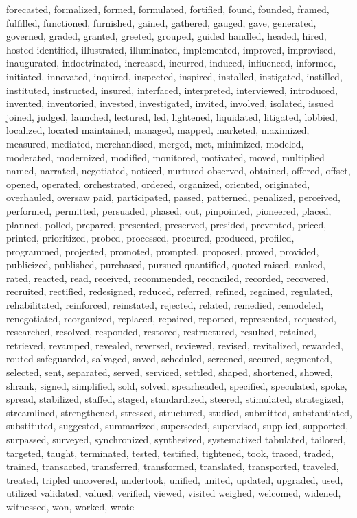\documentclass[a4paper,11pt]{article} %
\begin{document}
forecasted, formalized, formed, formulated, fortified, found, founded, framed,
fulfilled, functioned, furnished,
gained, gathered, gauged, gave, generated, governed, graded, granted, greeted,
grouped, guided
handled, headed, hired, hosted
identified, illustrated, illuminated, implemented, improved, improvised,
inaugurated, indoctrinated, increased, incurred, induced, influenced, informed,
initiated, innovated, inquired, inspected, inspired, installed, instigated,
instilled, instituted, instructed, insured, interfaced, interpreted,
interviewed, introduced, invented, inventoried, invested, investigated, invited,
involved, isolated, issued
joined, judged,
launched, lectured, led, lightened, liquidated, litigated, lobbied, localized,
located
maintained, managed, mapped, marketed, maximized, measured, mediated,
merchandised, merged, met, minimized, modeled, moderated, modernized, modified,
monitored, motivated, moved, multiplied
named, narrated, negotiated, noticed, nurtured
observed, obtained, offered, offset, opened, operated, orchestrated, ordered,
organized, oriented, originated, overhauled, oversaw
paid, participated, passed, patterned, penalized, perceived, performed,
permitted, persuaded, phased, out, pinpointed, pioneered, placed, planned,
polled, prepared, presented, preserved, presided, prevented, priced, printed,
prioritized, probed, processed, procured, produced, profiled, programmed,
projected, promoted, prompted, proposed, proved, provided, publicized,
published, purchased, pursued
quantified, quoted
raised, ranked, rated, reacted, read, received, recommended, reconciled,
recorded, recovered, recruited, rectified, redesigned, reduced, referred,
refined, regained, regulated, rehabilitated, reinforced, reinstated, rejected,
related, remedied, remodeled, renegotiated, reorganized, replaced, repaired,
reported, represented, requested, researched, resolved, responded, restored,
restructured, resulted, retained, retrieved, revamped, revealed, reversed,
reviewed, revised, revitalized, rewarded, routed
safeguarded, salvaged, saved, scheduled, screened, secured, segmented, selected,
sent, separated, served, serviced, settled, shaped, shortened, showed, shrank,
signed, simplified, sold, solved, spearheaded, specified, speculated, spoke,
spread, stabilized, staffed, staged, standardized, steered, stimulated,
strategized, streamlined, strengthened, stressed, structured, studied,
submitted, substantiated, substituted, suggested, summarized, superseded,
supervised, supplied, supported, surpassed, surveyed, synchronized, synthesized,
systematized
tabulated, tailored, targeted, taught, terminated, tested, testified, tightened,
took, traced, traded, trained, transacted, transferred, transformed, translated,
transported, traveled, treated, tripled
uncovered, undertook, unified, united, updated, upgraded, used, utilized
validated, valued, verified, viewed, visited
weighed, welcomed, widened, witnessed, won, worked, wrote
\end{document}
